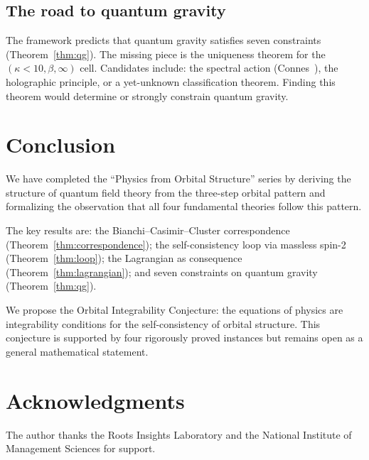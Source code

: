 \documentclass[12pt]{article}
\theoremstyle{plain}
\theoremstyle{definition}
\theoremstyle{remark}
\begin{document}
\subsection{The road to quantum gravity}

The framework predicts that quantum gravity satisfies seven constraints (Theorem~\ref{thm:qg}). The missing piece is the uniqueness theorem for the $(\kappa < 10, \beta, \infty)$ cell. Candidates include: the spectral action (Connes~\cite{connes1996}), the holographic principle, or a yet-unknown classification theorem. Finding this theorem would determine or strongly constrain quantum gravity.


\section{Conclusion}
\label{sec:conclusion}

We have completed the ``Physics from Orbital Structure'' series by deriving the structure of quantum field theory from the three-step orbital pattern and formalizing the observation that all four fundamental theories follow this pattern.

The key results are: the Bianchi--Casimir--Cluster correspondence (Theorem~\ref{thm:correspondence}); the self-consistency loop via massless spin-2 (Theorem~\ref{thm:loop}); the Lagrangian as consequence (Theorem~\ref{thm:lagrangian}); and seven constraints on quantum gravity (Theorem~\ref{thm:qg}).

We propose the Orbital Integrability Conjecture: the equations of physics are integrability conditions for the self-consistency of orbital structure. This conjecture is supported by four rigorously proved instances but remains open as a general mathematical statement.

\begin{center}
\end{center}


\section*{Acknowledgments}
The author thanks the Roots Insights Laboratory and the National Institute of Management Sciences for support.
\end{document}
